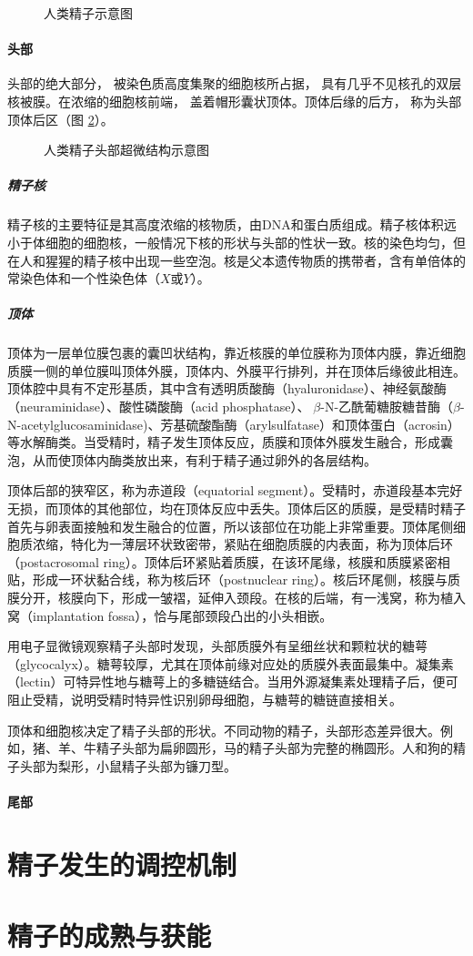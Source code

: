 \begin{figure}[H]
\centering
\myFigurePlaceholder
\caption{人类精子示意图}
\label{图-人类精子示意图}
\end{figure}

\paragraph{头部}

头部的绝大部分， 被染色质高度集聚的细胞核所占据， 具有几乎不见核孔的双层核被膜。在浓缩的细胞核前端， 盖着帽形囊状顶体。顶体后缘的后方， 称为头部顶体后区（图 \ref{图-人类精子头部超微结构示意图}）。

\begin{figure}[H]
\centering
\myFigurePlaceholder
\caption{人类精子头部超微结构示意图}
\label{图-人类精子头部超微结构示意图}
\end{figure}

\subparagraph{精子核}

精子核的主要特征是其高度浓缩的核物质，由DNA和蛋白质组成。精子核体积远小于体细胞的细胞核，一般情况下核的形状与头部的性状一致。核的染色均匀，但在人和猩猩的精子核中出现一些空泡。核是父本遗传物质的携带者，含有单倍体的常染色体和一个性染色体（$ X $或$ Y $）。

\subparagraph{顶体}

顶体为一层单位膜包裹的囊凹状结构，靠近核膜的单位膜称为顶体内膜，靠近细胞质膜一侧的单位膜叫顶体外膜，顶体内、外膜平行排列，并在顶体后缘彼此相连。顶体腔中具有不定形基质，其中含有透明质酸酶（hyaluronidase）、神经氨酸酶（neuraminidase）、酸性磷酸酶（acid phosphatase）、􀀌$ \beta $-N-乙酰葡糖胺糖昔酶（$ \beta $-N-acetylglu­cosaminidase)、芳基硫酸酯酶（arylsulfatase）和顶体蛋白（acrosin）等水解酶类。当受精时，精子发生顶体反应，质膜和顶体外膜发生融合，形成囊泡，从而使顶体内酶类放出来，有利于精子通过卵外的各层结构。

顶体后部的狭窄区，称为赤道段（equatorial segment）。受精时，赤道段基本完好无损，而顶体的其他部位，均在顶体反应中丢失。顶体后区的质膜，是受精时精子首先与卵表面接触和发生融合的位置，所以该部位在功能上非常重要。顶体尾侧细胞质浓缩，特化为一薄层环状致密带，紧贴在细胞质膜的内表面，称为顶体后环（postacrosomal ring）。顶体后环紧贴着质膜，在该环尾缘，核膜和质膜紧密相贴，形成一环状黏合线，称为核后环（postnuclear ring）。核后环尾侧，核膜与质膜分开，核膜向下，形成一皱褶，延伸入颈段。在核的后端，有一浅窝，称为植入窝（implantation fossa），恰与尾部颈段凸出的小头相嵌。

用电子显微镜观察精子头部时发现，头部质膜外有呈细丝状和颗粒状的糖萼（glycocalyx）。糖萼较厚，尤其在顶体前缘对应处的质膜外表面最集中。凝集素（lectin）可特异性地与糖萼上的多糖链结合。当用外源凝集素处理精子后，便可阻止受精，说明受精时特异性识别卵母细胞，与糖萼的糖链直接相关。

顶体和细胞核决定了精子头部的形状。不同动物的精子，头部形态差异很大。例如，猪、羊、牛精子头部为扁卵圆形，马的精子头部为完整的椭圆形。人和狗的精子头部为梨形，小鼠精子头部为镰刀型。

\paragraph{尾部}

\section{精子发生的调控机制}


\section{精子的成熟与获能}
